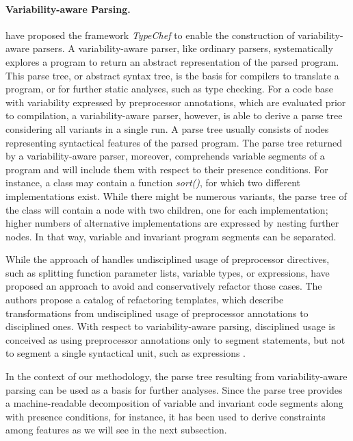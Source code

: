 \paragraph{Variability-aware Parsing.} \cite{kastner_variability-aware_2011}
have proposed the framework \emph{TypeChef} to enable the construction of
variability-aware parsers. A variability-aware parser, like ordinary parsers,
systematically explores a program to return an abstract representation of the
parsed program. This parse tree, or abstract syntax tree,
is the basis for compilers to translate a program, or for further static
analyses, such as type checking. For a code base with variability expressed by
preprocessor annotations, which are evaluated prior to compilation, a
variability-aware parser, however, is able to derive a parse tree considering
all variants in a single run. A parse tree usually consists of nodes
representing syntactical features of the parsed program. The parse tree
returned by a variability-aware parser, moreover, comprehends variable segments
of a program and will include them with respect to their presence conditions.
For instance, a class may contain a function \textit{sort()}, for which two
different implementations exist. While there might be numerous variants, the parse tree
of the class will contain a node with two children, one for each
implementation; higher numbers of alternative implementations are expressed by
nesting further nodes. In that way, variable and invariant program segments
can be separated.

While the approach of \cite{kastner_variability-aware_2011} handles
undisciplined usage of preprocessor directives, such as splitting function parameter lists, variable types, or
expressions, \cite{medeiros_discipline_2017} have proposed an approach to avoid and
conservatively refactor those cases. The authors propose a catalog of
refactoring templates, which describe transformations from undisciplined usage
of preprocessor annotations to disciplined ones. With respect to
variability-aware parsing, disciplined usage is conceived as using preprocessor
annotations only to segment statements, but not to segment a single syntactical
unit, such as expressions \citep{medeiros_discipline_2017}.

In the context of our methodology, the parse tree resulting from
variability-aware parsing can be used as a basis for further analyses. Since
the parse tree provides a machine-readable decomposition of variable and
invariant code segments along with presence conditions, for instance, it has
been used to derive constraints among features
\citep{nadi_mining_2014,nadi_where_2015} as we will see in the next subsection.

